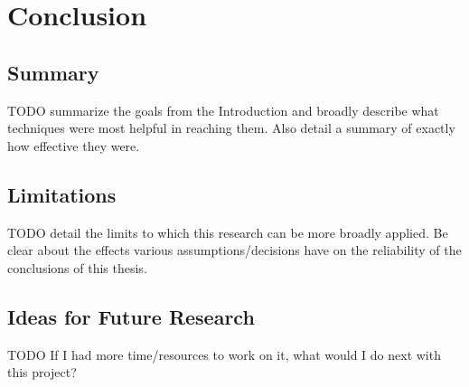 
\chapter{Conclusion} %

\label{Chapter8} %


\section{Summary}
TODO summarize the goals from the Introduction and broadly describe what techniques were most helpful in reaching them. Also detail a summary of exactly how effective they were.


\section{Limitations}

TODO detail the limits to which this research can be more broadly applied. Be clear about the effects various assumptions/decisions have on the reliability of the conclusions of this thesis.


\section{Ideas for Future Research}

TODO If I had more time/resources to work on it, what would I do next with this project?